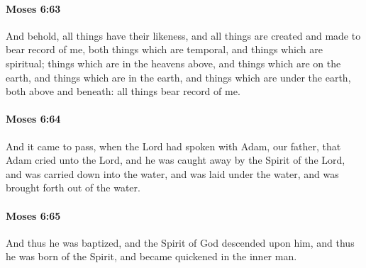 		\paragraph{Moses 6:63} %
			\label{MOSES-6-63}

			And behold, all things have their likeness, and all things are created and made to bear record of me, both things which are temporal, and things which are spiritual; things which are in the heavens above, and things which are on the earth, and things which are in the earth, and things which are under the earth, both above and beneath: all things bear record of me.


		\paragraph{Moses 6:64} %
			\label{MOSES-6-64}

			And it came to pass, when the Lord had spoken with Adam, our father, that Adam cried unto the Lord, and he was caught away by the Spirit of the Lord, and was carried down into the water, and was laid under the water, and was brought forth out of the water.


		\paragraph{Moses 6:65} %
			\label{MOSES-6-65}

			And thus he was baptized, and the Spirit of God descended upon him, and thus he was born of the Spirit, and became quickened in the inner man.

